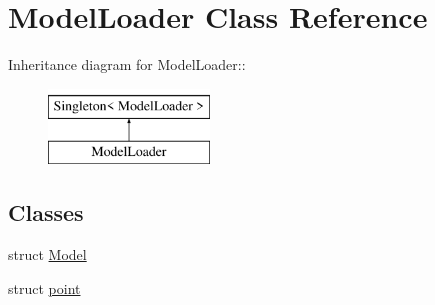 \hypertarget{classModelLoader}{
\section{ModelLoader Class Reference}
\label{classModelLoader}
}
Inheritance diagram for ModelLoader::\begin{figure}[H]
\begin{center}
\leavevmode
\includegraphics[height=2cm]{classModelLoader}
\end{center}
\end{figure}
\subsection*{Classes}
\begin{DoxyCompactItemize}
\item 
struct \hyperlink{structModelLoader_1_1Model}{Model}
\item 
struct \hyperlink{structModelLoader_1_1point}{point}
\end{DoxyCompactItemize}
